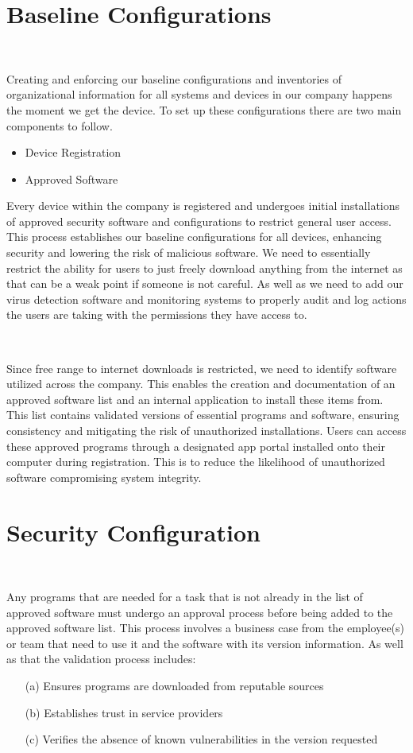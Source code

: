 \documentclass[12pt,a4paper]{report}
\begin{document}
\section{Baseline Configurations}
\

Creating and enforcing our baseline configurations and inventories of organizational information for all systems and devices in our company happens the moment we get the device.
To set up these configurations there are two main components to follow.
\begin{itemize}
 \item Device Registration
 \item Approved Software
\end{itemize}

Every device within the company is registered and undergoes initial installations of approved security software and configurations to restrict general user access.
This process establishes our baseline configurations for all devices, enhancing security and lowering the risk of malicious software.
We need to essentially restrict the ability for users to just freely download anything from the internet as that can be a weak point if someone is not careful.
As well as we need to add our virus detection software and monitoring systems to properly audit and log actions the users are taking with the permissions they have access to.

\

Since free range to internet downloads is restricted, we need to identify software utilized across the company.
This enables the creation and documentation of an approved software list and an internal application to install these items from. 
This list contains validated versions of essential programs and software, ensuring consistency and mitigating the risk of unauthorized installations.
Users can access these approved programs through a designated app portal installed onto their computer during registration.
This is to reduce the likelihood of unauthorized software compromising system integrity.

\section{Security Configuration}
\

Any programs that are needed for a task that is not already in the list of approved software must undergo an approval process before being added to the approved software list.
This process involves a business case from the employee(s) or team that need to use it and the software with its version information. 
As well as that the validation process includes:
\begin{itemize}
 \item [(a)] Ensures programs are downloaded from reputable sources
 \item [(b)] Establishes trust in service providers
 \item [(c)] Verifies the absence of known vulnerabilities in the version requested
\end{itemize}
\end{document}
